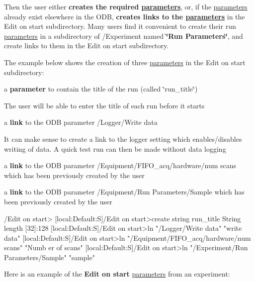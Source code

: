 \label{RC_customize_ODB_RC_rp}
\hypertarget{RC_customize_ODB_RC_rp}{}
 Then the user either {\bfseries creates the required \hyperlink{structparameters}{parameters}}, or, if the \hyperlink{structparameters}{parameters} already exist elsewhere in the ODB, {\bfseries creates links to the \hyperlink{structparameters}{parameters}} in the Edit on start subdirectory. Many users find it convenient to create their run \hyperlink{structparameters}{parameters} in a subdirectory of /Experiment named {\bfseries \char`\"{}Run Parameters\char`\"{}}, and create links to them in the Edit on start subdirectory.

\par
\par
The example below shows the creation of three \hyperlink{structparameters}{parameters} in the Edit on start subdirectory: 
\begin{DoxyEnumerate}
\item a {\bfseries parameter} to contain the title of the run (called \char`\"{}run\_\-title\char`\"{}) \par
 The user will be able to enter the title of each run before it starts 
\item a {\bfseries link} to the ODB parameter /Logger/Write data \par
 It can make sense to create a link to the logger setting which enables/disables writing of data. A quick test run can then be made without data logging 
\item a {\bfseries link} to the ODB parameter /Equipment/FIFO\_\-acq/hardware/num scans which has been previously created by the user 
\item a {\bfseries link} to the ODB parameter /Equipment/Run Parameters/Sample which has been previously created by the user 
\end{DoxyEnumerate}


\begin{DoxyCode}
/Edit on start>
[local:Default:S]/Edit on start>create string run_title
String length [32]:128
[local:Default:S]/Edit on start>ln "/Logger/Write data" "write data"
[local:Default:S]/Edit on start>ln "/Equipment/FIFO_acq/hardware/num scans" "Numb
      er of scans"
[local:Default:S]/Edit on start>ln "/Experiment/Run Parameters/Sample" "sample"
\end{DoxyCode}


Here is an example of the {\bfseries Edit on start} \hyperlink{structparameters}{parameters} from an experiment:


